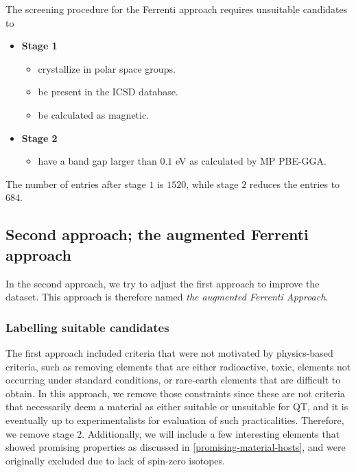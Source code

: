 The screening procedure for the Ferrenti approach requires unsuitable candidates to

\begin{itemize}
  \item[]{\textbf{Stage 1}}
  \begin{itemize}
  \item crystallize in polar space groups.
  \item be present in the ICSD database.
  \item be calculated as magnetic.
  \end{itemize}
  \item[]{\textbf{Stage 2}}
  \begin{itemize}
  \item have a band gap larger than $0.1$ eV as calculated by MP PBE-GGA.
  \end{itemize}
\end{itemize}

\noindent The number of entries after stage $1$ is $1520$, while stage $2$ reduces the entries to $684$.

\subsection{Second approach; the augmented Ferrenti approach}

In the second approach, we try to adjust the first approach to improve the dataset. This approach is therefore named \textit{the augmented Ferrenti Approach}.

\subsubsection{Labelling suitable candidates}

The first approach included criteria that were not motivated by physics-based criteria, such as removing elements that are either radioactive, toxic, elements not occurring under standard conditions, or rare-earth elements that are difficult to obtain. In this approach, we remove those constraints since these are not criteria that necessarily deem a material as either suitable or unsuitable for QT, and it is eventually up to experimentalists for evaluation of such practicalities. Therefore, we remove stage $2$. Additionally, we will include a few interesting elements that showed promising properties as discussed in \autoref{promising-material-hosts}, and were originally excluded due to lack of spin-zero isotopes.

